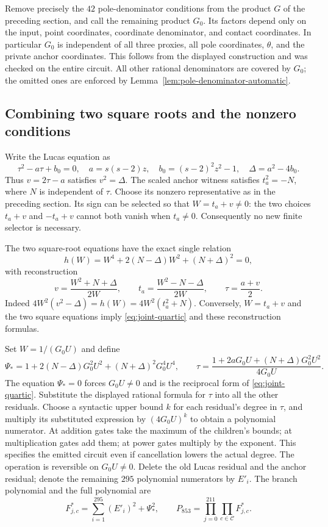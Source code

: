 \documentclass[11pt]{article}
\theoremstyle{definition}
\begin{document}
Remove precisely the $42$ pole-denominator conditions from the product
$G$ of the preceding section, and call the remaining product $G_0$.
Its factors depend only on the input, point coordinates, coordinate
denominator, and contact coordinates. In particular $G_0$ is independent
of all three proxies, all pole coordinates, $\theta$, and the private
anchor coordinates. This follows from the displayed construction and
was checked on the entire circuit. All other rational denominators
are covered by $G_0$; the omitted ones are enforced by
Lemma~\ref{lem:pole-denominator-automatic}.

\subsection{Combining two square roots and the nonzero conditions}

Write the Lucas equation as
\[
 \tau^2-a\tau+b_0=0,\quad
 a=s(s-2)z,\quad b_0=(s-2)^2z^2-1,\quad
 \Delta=a^2-4b_0.
\]
Thus $v=2\tau-a$ satisfies $v^2=\Delta$. The scaled anchor witness
satisfies $t_a^2=-N$, where $N$ is independent of $\tau$.
Choose its nonzero representative as in the preceding section.
Its sign can be selected so that $W=t_a+v\ne0$: the two choices
$t_a+v$ and $-t_a+v$ cannot both vanish when $t_a\ne0$.
Consequently no new finite selector is necessary.

The two square-root equations have the exact single relation
\begin{equation}\label{eq:joint-quartic}
 h(W)=W^4+2(N-\Delta)W^2+(N+\Delta)^2=0,
\end{equation}
with reconstruction
\[
 v=\frac{W^2+N+\Delta}{2W},\qquad
 t_a=\frac{W^2-N-\Delta}{2W},\qquad
 \tau=\frac{a+v}{2}.
\]
Indeed $4W^2(v^2-\Delta)=h(W)=4W^2(t_a^2+N)$.
Conversely, $W=t_a+v$ and the two square equations imply
\eqref{eq:joint-quartic} and these reconstruction formulas.

Set $W=1/(G_0U)$ and define
\[
 \Psi_*=1+2(N-\Delta)G_0^2U^2+(N+\Delta)^2G_0^4U^4,
 \qquad
 \tau=\frac{1+2aG_0U+(N+\Delta)G_0^2U^2}{4G_0U}.
\]
The equation $\Psi_*=0$ forces $G_0U\ne0$ and is the reciprocal
form of \eqref{eq:joint-quartic}. Substitute the displayed rational
formula for $\tau$ into all the other residuals. Choose a syntactic
upper bound $k$ for each residual's degree in $\tau$, and multiply
its substituted expression by $(4G_0U)^k$ to obtain a polynomial
numerator. At addition gates take the maximum of the children's
bounds; at multiplication gates add them; at power gates multiply
by the exponent. This specifies the emitted circuit even if
cancellation lowers the actual degree. The operation is reversible
on $G_0U\ne0$.
Delete the old Lucas residual and the anchor residual; denote the
remaining $295$ polynomial numerators by $E'_i$. The branch polynomial
and the full polynomial are
\[
 F^*_{j,c}=\sum_{i=1}^{295}(E'_i)^2+\Psi_*^2,
 \qquad
 P_{853}=\prod_{j=0}^{211}\prod_{c\in\mathcal C}F^*_{j,c}.
\]
\end{document}
